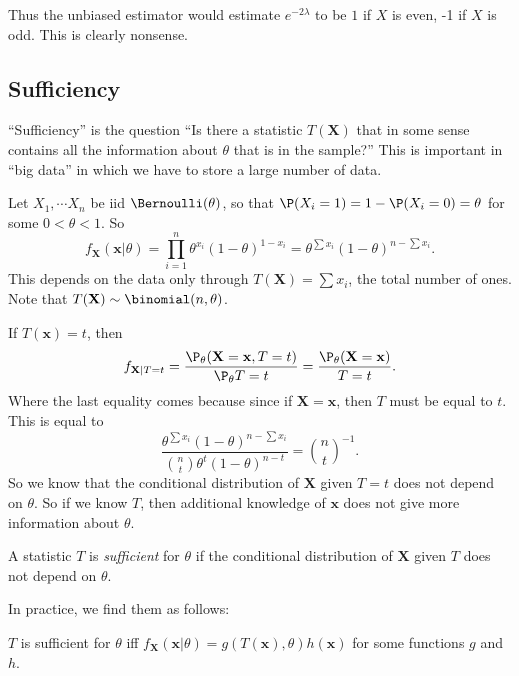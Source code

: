 \documentclass[a4paper]{article}
\begin{document}
Thus the unbiased estimator would estimate $e^{-2\lambda}$ to be $1$ if $X$ is even, -1 if $X$ is odd. This is clearly nonsense.
\subsection{Sufficiency}
``Sufficiency'' is the question ``Is there a statistic $T(\mathbf{X})$ that in some sense contains all the information about $\theta$ that is in the sample?'' This is important in ``big data'' in which we have to store a large number of data.

\begin{eg}
  Let $X_1, \cdots X_n$ be iid $\Bernoulli(\theta)$, so that $\P(X_i = 1) = 1 - \P(X_i = 0) = \theta$ for some $0 < \theta < 1$. So
  \[
    f_{\mathbf{X}} (\mathbf{x}|\theta) = \prod_{i = 1}^n \theta^{x_i}(1 - \theta)^{1 - x_i} = \theta^{\sum x_i}(1 - \theta)^{n - \sum x_i}.
  \]
  This depends on the data only through $T(\mathbf{X}) = \sum x_i$, the total number of ones. Note that $T(\mathbf{X})\sim \binomial(n, \theta)$.

  If $T(\mathbf{x}) = t$, then
  \[
    f_{\mathbf{X}|T = t} = \frac{\P_\theta(\mathbf{X} = \mathbf{x}, T = t)}{\P_\theta T = t} = \frac{\P_\theta(\mathbf{X} = \mathbf{x})}{T = t}.
  \]
  Where the last equality comes because since if $\mathbf{X} = \mathbf{x}$, then $T$ must be equal to $t$. This is equal to
  \[
    \frac{\theta^{\sum x_i}(1 - \theta)^{n - \sum x_i}}{\binom{n}{t}\theta^t (1 - \theta)^{n - t}} = \binom{n}{t}^{-1}.
  \]
  So we know that the conditional distribution of $\mathbf{X}$ given $T = t$ does not depend on $\theta$. So if we know $T$, then additional knowledge of $\mathbf{x}$ does not give more information about $\theta$.
\end{eg}

\begin{defi}
  A statistic $T$ is \emph{sufficient} for $\theta$ if the conditional distribution of $\mathbf{X}$ given $T$ does not depend on $\theta$.
\end{defi}

In practice, we find them as follows:
\begin{thm}
  $T$ is sufficient for $\theta$ iff $f_{\mathbf{X}}(\mathbf{x} |\theta) = g(T(\mathbf{x}), \theta)h(\mathbf{x})$ for some functions $g$ and $h$.
\end{thm}
\end{document}
